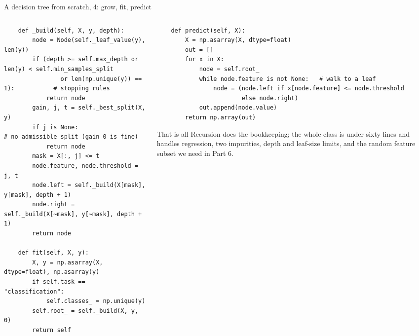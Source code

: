 \documentclass[10pt,aspectratio=169]{beamer}
\begin{document}
\begin{frame}[fragile]{A decision tree from scratch, 4: grow, fit, predict}
\begin{columns}[T]
\begin{column}{0.56\textwidth}
\begin{lstlisting}
    def _build(self, X, y, depth):
        node = Node(self._leaf_value(y), len(y))
        if (depth >= self.max_depth or len(y) < self.min_samples_split
                or len(np.unique(y)) == 1):           # stopping rules
            return node
        gain, j, t = self._best_split(X, y)
        if j is None:                             # no admissible split (gain 0 is fine)
            return node
        mask = X[:, j] <= t
        node.feature, node.threshold = j, t
        node.left = self._build(X[mask], y[mask], depth + 1)
        node.right = self._build(X[~mask], y[~mask], depth + 1)
        return node

    def fit(self, X, y):
        X, y = np.asarray(X, dtype=float), np.asarray(y)
        if self.task == "classification":
            self.classes_ = np.unique(y)
        self.root_ = self._build(X, y, 0)
        return self
\end{lstlisting}
\end{column}
\begin{column}{0.42\textwidth}
\begin{lstlisting}
    def predict(self, X):
        X = np.asarray(X, dtype=float)
        out = []
        for x in X:
            node = self.root_
            while node.feature is not None:   # walk to a leaf
                node = (node.left if x[node.feature] <= node.threshold
                        else node.right)
            out.append(node.value)
        return np.array(out)
\end{lstlisting}
\small
\begin{block}{That is all}
Recursion does the bookkeeping; the whole class is under sixty lines and
handles regression, two impurities, depth and leaf-size limits, and the
random feature subset we need in Part 6.
\end{block}
\end{column}
\end{columns}
\end{frame}
\end{document}
